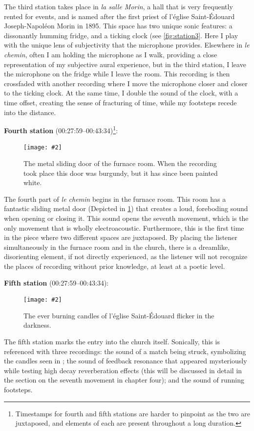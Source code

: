 \documentclass[12pt,twoside,maitrise]{dms_ks}
\newcommand{\customincludegraphics}[4][]{%
    \begin{figure}[H]
        \centering
        \texttt{[image: \#2]}
        \caption{#4}
	\label{#3} 
    \end{figure}
}
\theoremstyle{definition}
\begin{document}
{{The third station takes place in \textit{la salle Morin}, a hall that is very frequently rented for events, and is named after the first priest of l'église Saint-Édouard Joseph-Napoléon Morin in 1895. 
This space has two unique sonic features: a dissonantly humming fridge, and a ticking clock (see \cref{fig:station3}. 
Here I play with the unique lens of subjectivity that the microphone provides. 
Elsewhere in \textit{le chemin}, often I am holding the microphone as I walk, providing a close representation of my subjective aural experience, but in the third station, I leave the microphone on the fridge while I leave the room. 
This recording is then crossfaded with another recording where I move the microphone closer and closer to the ticking clock. 
At the same time, I double the sound of the clock, with a time offset, creating the sense of fracturing of time, while my footsteps recede into the distance.

\textbf{Fourth station} (00:27:59--00:43:34)\footnote{Timestamps for fourth and fifth stations are harder to pinpoint as the two are juxtaposed, and elements of each are present throughout a long duration.}:

\customincludegraphics[scale=0.25]{DSC00157.JPG}{fig:station4}{The metal sliding door of the furnace room. When the recording took place this door was burgundy, but it has since been painted white.}%

The fourth part of \textit{le chemin} begins in the furnace room. 
This room has a fantastic sliding metal door (Depicted in \cref{fig:station4}) that creates a loud, foreboding sound when opening or closing it. 
This sound opens the seventh movement, which is the only movement that is wholly electroacoustic. 
Furthermore, this is the first time in the piece where two different spaces are juxtaposed. 
By placing the listener simultaneously in the furnace room and in the church, there is a dreamlike, disorienting element, if not directly experienced, as the listener will not recognize the places of recording without prior knowledge, at least at a poetic level.

\textbf{Fifth station} (00:27:59--00:43:34):

\customincludegraphics[scale=0.05]{candles.JPG}{station5}{The ever burning candles of l'église Saint-Édouard flicker in the darkness.}%

The fifth station marks the entry into the church itself. 
Sonically, this is referenced with three recordings: the sound of a match being struck, symbolizing the candles seen in ; the sound of feedback resonance that appeared mysteriously while testing high decay reverberation effects (this will be discussed in detail in the section on the seventh movement in chapter four); and the sound of running footsteps. 

}}
\end{document}
